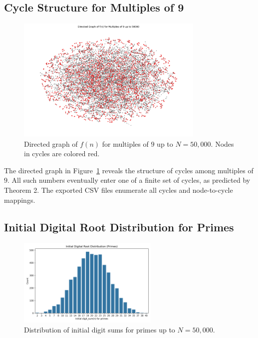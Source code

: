 \documentclass[12pt]{article}
\begin{document}
\subsection{Cycle Structure for Multiples of 9}
\begin{figure}[H]
    \centering
    \includegraphics[width=0.8\textwidth]{fig_cycles_graph.png}
    \caption{Directed graph of $f(n)$ for multiples of $9$ up to $N=50,000$. Nodes in cycles are colored red.}
    \label{fig:cycles_graph}
\end{figure}
The directed graph in Figure~\ref{fig:cycles_graph} reveals the structure of cycles among multiples of $9$. All such numbers eventually enter one of a finite set of cycles, as predicted by Theorem 2. The exported CSV files enumerate all cycles and node-to-cycle mappings.

\subsection{Initial Digital Root Distribution for Primes}
\begin{figure}[H]
    \centering
    \includegraphics[width=0.6\textwidth]{fig_initial_digit_sum_primes.png}
    \caption{Distribution of initial digit sums for primes up to $N=50,000$.}
    \label{fig:digit_sum_primes}
\end{figure}
\end{document}
